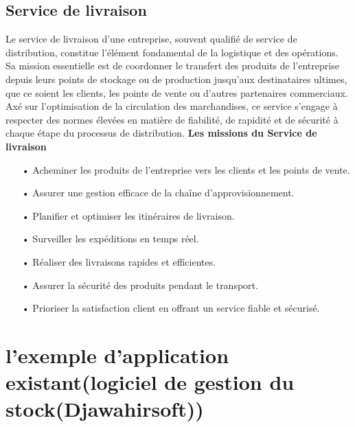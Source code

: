\documentclass[edit,12pt,a4paper,ChapStyle,oneside,doubleinterligne]{report}
\begin{document}
\subsection{Service de livraison}
Le service de livraison d'une entreprise, souvent qualifié de service de distribution, constitue l'élément fondamental de la logistique et des opérations. Sa mission essentielle est de coordonner le transfert des produits de l'entreprise depuis leurs points de stockage ou de production jusqu'aux destinataires ultimes, que ce soient les clients, les points de vente ou d'autres partenaires commerciaux. Axé sur l'optimisation de la circulation des marchandises, ce service s'engage à respecter des normes élevées en matière de fiabilité, de rapidité et de sécurité à chaque étape du processus de distribution.
\cite{logistique}\newline\textbf{Les missions du Service de livraison}\newline
\begin{itemize}
    \item [•] Acheminer les produits de l'entreprise vers les clients et les points de vente.
    \item [•] Assurer une gestion efficace de la chaîne d'approvisionnement. 
    \item [•] Planifier et optimiser les itinéraires de livraison. 
    \item [•] Surveiller les expéditions en temps réel. 
    \item [•] Réaliser des livraisons rapides et efficientes. 
    \item [•] Assurer la sécurité des produits pendant le transport. 
    \item [•] Prioriser la satisfaction client en offrant un service fiable et sécurisé.
\end{itemize}




\section{l'exemple d'application existant(logiciel de gestion du stock(Djawahirsoft))}
\end{document}
